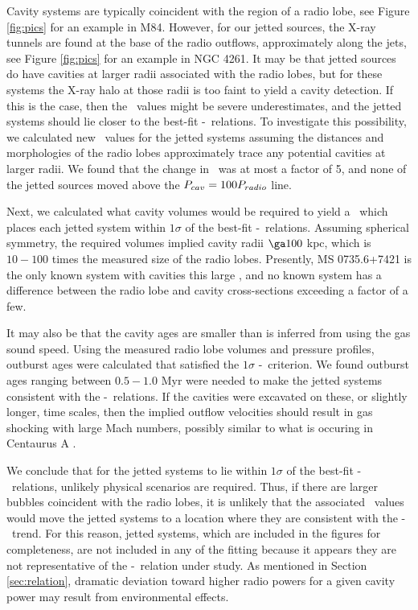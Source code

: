 \documentclass{emulateapj}
\begin{document}
Cavity systems are typically coincident with the region of a radio
lobe, see Figure \ref{fig:pics} for an example in M84. However, for
our jetted sources, the X-ray tunnels are found at the base of the
radio outflows, approximately along the jets, see Figure
\ref{fig:pics} for an example in NGC 4261. It may be that jetted
sources do have cavities at larger radii associated with the radio
lobes, but for these systems the X-ray halo at those radii is too
faint to yield a cavity detection. If this is the case, then the
\pcav\ values might be severe underestimates, and the jetted systems
should lie closer to the best-fit \pcav-\prad\ relations. To
investigate this possibility, we calculated new \pcav\ values for the
jetted systems assuming the distances and morphologies of the radio
lobes approximately trace any potential cavities at larger radii. We
found that the change in \pcav\ was at most a factor of 5, and none of
the jetted sources moved above the $P_{cav} = 100P_{radio}$ line.

Next, we calculated what cavity volumes would be required to yield a
\pcav\ which places each jetted system within $1\sigma$ of the
best-fit \pcav-\prad\ relations. Assuming spherical symmetry, the
required volumes implied cavity radii $\ga 100$ kpc, which is $10-100$
times the measured size of the radio lobes. Presently, MS 0735.6+7421
is the only known system with cavities this large \citep{ms0735}, and
no known system has a difference between the radio lobe and cavity
cross-sections exceeding a factor of a few.

It may also be that the cavity ages are smaller than is inferred from
using the gas sound speed. Using the measured radio lobe volumes and
pressure profiles, outburst ages were calculated that satisfied the
$1\sigma$ \pcav-\prad\ criterion. We found outburst ages ranging
between $0.5-1.0$ Myr were needed to make the jetted systems
consistent with the \pcav-\prad\ relations. If the cavities were
excavated on these, or slightly longer, time scales, then the implied
outflow velocities should result in gas shocking with large Mach
numbers, possibly similar to what is occuring in Centaurus A
\citep{2009MNRAS.395.1999C}.

We conclude that for the jetted systems to lie within $1\sigma$ of the
best-fit \pcav-\prad\ relations, unlikely physical scenarios are
required. Thus, if there are larger bubbles coincident with the radio
lobes, it is unlikely that the associated \pcav\ values would move the
jetted systems to a location where they are consistent with the
\pcav-\prad\ trend. For this reason, jetted systems, which are
included in the figures for completeness, are not included in any of
the fitting because it appears they are not representative of the
\pcav-\prad\ relation under study. As mentioned in Section
\ref{sec:relation}, dramatic deviation toward higher radio powers for
a given cavity power may result from environmental effects.
\end{document}
